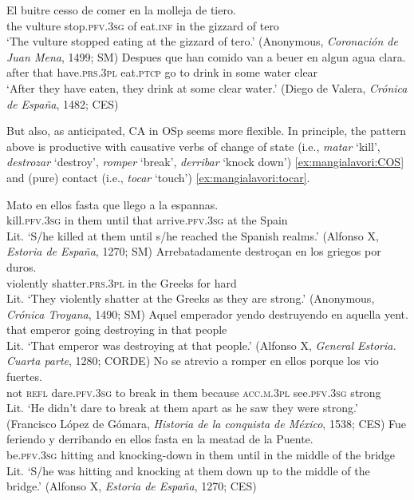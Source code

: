 \documentclass[output=paper,colorlinks,citecolor=brown,
]{langscibook}
\begin{document}
\ea\label{ex:mangialavori:12}
  \ea
    \gll El buitre cesso de comer en la molleja de tiero.\\
    the vulture stop.\textsc{pfv}.\textsc{3sg} of eat.\textsc{inf} in the gizzard of tero\\
    \glt ‘The vulture stopped eating at the gizzard of tero.’ (Anonymous, \textit{Coronación de Juan Mena}, 1499; SM)
  \ex
    \gll Despues que han comido van a beuer en algun agua clara.\\
    after that have.\textsc{prs}.\textsc{3pl} eat.\textsc{ptcp} go to drink in some water clear\\
    \glt ‘After they have eaten, they drink at some clear water.’ (Diego de Valera, \textit{Crónica de España}, 1482; CES)
  \z 
\z 


But also, as anticipated, CA in OSp seems more flexible. In principle, the pattern above is productive with causative verbs of change of state (i.e., \textit{matar} ‘kill’, \textit{destrozar} ‘destroy’, \textit{romper} ‘break’, \textit{derribar} ‘knock down’)  \ref{ex:mangialavori:COS} and (pure) contact (i.e., \textit{tocar} ‘touch’)  \ref{ex:mangialavori:tocar}.

\ea\label{ex:mangialavori:COS}
  \ea
    \gll Mato en ellos fasta que llego a la espannas.\\
    kill.\textsc{pfv}.\textsc{3sg} in them until that arrive.\textsc{pfv}.\textsc{3sg} at the Spain\\
    \glt Lit. `S/he killed at them until s/he reached the Spanish realms.' (Alfonso X, \textit{Estoria de España}, 1270; SM)
  \ex
    \gll Arrebatadamente destroçan en los griegos por duros.\\
    violently shatter.\textsc{prs}.\textsc{3pl} in the Greeks for hard\\
    \glt Lit. ‘They violently shatter at the Greeks as they are strong.’ (Anonymous, \textit{Crónica Troyana}, 1490; SM)
  \ex
    \gll Aquel emperador yendo destruyendo en aquella yent.\\
    that emperor going destroying in that people\\
    \glt Lit. ‘That emperor was destroying at that people.’ (Alfonso X, \textit{General Estoria. Cuarta parte}, 1280; CORDE)
  \ex
    \gll No se atrevio a romper en ellos porque los vio fuertes.\\
not \textsc{refl} dare.\textsc{pfv}.\textsc{3sg} to break in them because \textsc{acc}.\textsc{m}.\textsc{3pl} see.\textsc{pfv}.\textsc{3sg} strong\\
    \glt Lit. ‘He didn’t dare to break at them apart as he saw they were strong.’ (Francisco López de Gómara, \textit{Historia de la conquista de México}, 1538; CES)
  \ex
    \gll Fue feriendo y derribando en ellos fasta en la meatad de la Puente.\\
be.\textsc{pfv}.\textsc{3sg} hitting and knocking-down in them  until in the middle of the bridge\\
    \glt Lit. ‘S/he was hitting and knocking at them down up to the middle of the bridge.’ (Alfonso X, \textit{Estoria de España}, 1270; CES) 
  \z 
\z 
\end{document}
